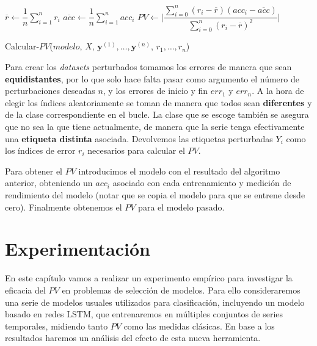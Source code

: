 \begin{algorithm}[htbp]
\SetAlgoLined
 $\overline{r} \gets \dfrac{1}{n} \sum \limits_{i = 1}^{n} r_i$\;
 $\overline{acc} \gets \dfrac{1}{n} \sum \limits_{i = 1}^{n} acc_i$\;
 $PV \gets \Bigg|\dfrac{\sum \limits^n_{i = 0} (r_i - \overline{r})(acc_i - \overline{acc})}{\sum \limits^n_{i = 0}(r_i - \overline{r})^2}\Bigg|$\;
 \caption{Calcular-$PV$($modelo$, $X$, $\textbf{y}^{(1)}, \ldots, \textbf{y}^{(n)}$, $r_1, \ldots, r_n$)}
 \label{alg:calc_pv}
\end{algorithm}

Para crear los \emph{datasets} perturbados tomamos los errores de manera que sean \textbf{equidistantes}, por lo que solo hace falta pasar como argumento el número de perturbaciones deseadas $n$, y los errores de inicio y fin $err_{1}$ y $err_{n}$. A la hora de elegir los índices aleatoriamente se toman de manera que todos sean \textbf{diferentes} y de la clase correspondiente en el bucle. La clase que se escoge también se asegura que no sea la que tiene actualmente, de manera que la serie tenga efectivamente una \textbf{etiqueta distinta} asociada. Devolvemos las etiquetas perturbadas $Y_i$ como los índices de error $r_i$ necesarios para calcular el $PV$.

Para obtener el $PV$ introducimos el modelo con el resultado del algoritmo anterior, obteniendo un $acc_i$ asociado con cada entrenamiento y medición de rendimiento del modelo (notar que se copia el modelo para que se entrene desde cero). Finalmente obtenemos el $PV$ para el modelo pasado.

\chapter{Experimentación}\label{ch:pv-experimentacion}

En este capítulo vamos a realizar un experimento empírico para investigar la eficacia del $PV$ en problemas de selección de modelos. Para ello consideraremos una serie de modelos usuales utilizados para clasificación, incluyendo un modelo basado en redes LSTM, que entrenaremos en múltiples conjuntos de series temporales, midiendo tanto $PV$ como las medidas clásicas. En base a los resultados haremos un análisis del efecto de esta nueva herramienta.

